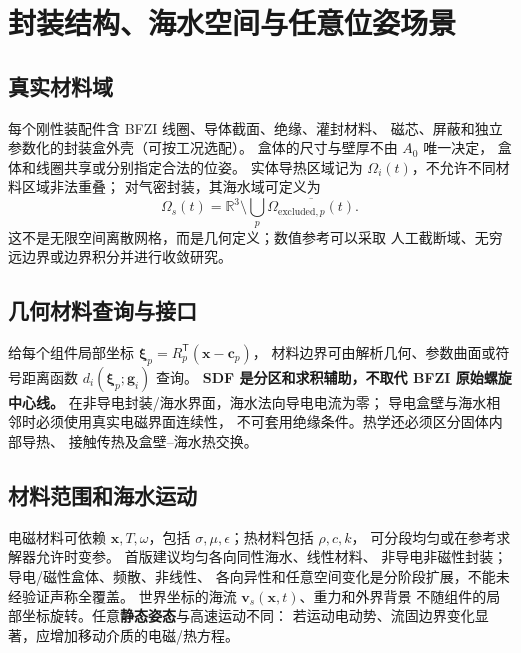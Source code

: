 \section{封装结构、海水空间与任意位姿场景}\label{sec:scene}
\subsection{真实材料域}
每个刚性装配件含 BFZI 线圈、导体截面、绝缘、灌封材料、
磁芯、屏蔽和独立参数化的封装盒外壳（可按工况选配）。
盒体的尺寸与壁厚不由 \(A_0\) 唯一决定，
盒体和线圈共享或分别指定合法的位姿。
实体导热区域记为 \(\Omega_i(t)\)，不允许不同材料区域非法重叠；
对气密封装，其海水域可定义为
\[
\Omega_s(t)=\mathbb R^3\setminus
\bigcup_p\overline{\Omega_{\mathrm{excluded},p}(t)}.
\]
这不是无限空间离散网格，而是几何定义；数值参考可以采取
人工截断域、无穷远边界或边界积分并进行收敛研究。

\subsection{几何材料查询与接口}
给每个组件局部坐标 \(\bm\xi_p=R_p^{\mathsf T}(\bm x-\bm c_p)\)，
材料边界可由解析几何、参数曲面或符号距离函数
\(d_i(\bm\xi_p;\bm g_i)\) 查询。
\textbf{SDF 是分区和求积辅助，不取代 BFZI 原始螺旋中心线。}
在非导电封装/海水界面，海水法向导电电流为零；
导电盒壁与海水相邻时必须使用真实电磁界面连续性，
不可套用绝缘条件。热学还必须区分固体内部导热、
接触传热及盒壁--海水热交换。

\subsection{材料范围和海水运动}
电磁材料可依赖 \(\bm x,T,\omega\)，包括
\(\sigma,\mu,\epsilon\)；热材料包括 \(\rho,c,k\)，
可分段均匀或在参考求解器允许时变参。
首版建议均匀各向同性海水、线性材料、
非导电非磁性封装；导电/磁性盒体、频散、非线性、
各向异性和任意空间变化是分阶段扩展，不能未经验证声称全覆盖。
世界坐标的海流 \(\bm v_s(\bm x,t)\)、重力和外界背景
不随组件的局部坐标旋转。任意\textbf{静态姿态}与高速运动不同：
若运动电动势、流固边界变化显著，应增加移动介质的电磁/热方程。
